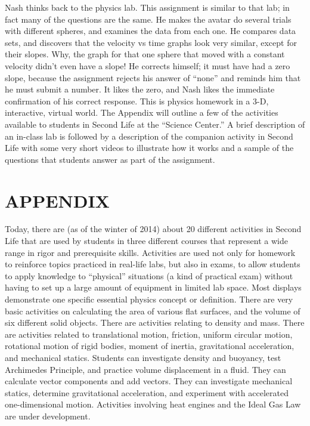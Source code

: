 \documentclass[11.5pt]{sig-alternate} %
\begin{document}
\begin{large}
Nash thinks back to the physics lab. This assignment is similar to that lab; in fact many of the questions are the same. He makes the avatar do several trials with different spheres, and examines the data from each one. He compares data sets, and discovers that the velocity vs time graphs look very similar, except for their slopes. Why, the graph for that one sphere that moved with a constant velocity didn’t even have a slope! He corrects himself; it must have had a zero slope, because the assignment rejects his answer of “none” and reminds him that he must submit a number. It likes the zero, and Nash likes the immediate confirmation of his correct response. This is physics homework in a 3-D, interactive, virtual world. The Appendix will outline a few of the activities available to students in Second Life at the “Science Center.” A brief description of an in-class lab is followed by a description of the companion activity in Second Life with some very short videos to illustrate how it works and a sample of the questions that students answer as part of the assignment.

\section*{APPENDIX}

Today, there are (as of the winter of 2014) about 20 different activities in Second Life that are used by students in three different courses that represent a wide range in rigor and prerequisite skills. Activities are used not only for homework to reinforce topics practiced in real-life labs, but also in exams, to allow students to apply knowledge to “physical” situations (a kind of practical exam) without having to set up a large amount of equipment in limited lab space. Most displays demonstrate one specific essential physics concept or definition. There are very basic activities on calculating the area of various flat surfaces, and the volume of six different solid objects. There are activities relating to density and mass. There are activities related to translational motion, friction, uniform circular motion, rotational motion of rigid bodies, moment of inertia, gravitational acceleration, and mechanical statics. Students can investigate density and buoyancy, test Archimedes Principle, and practice volume displacement in a fluid. They can calculate vector components and add vectors. They can investigate mechanical statics, determine gravitational acceleration, and experiment with accelerated one-dimensional motion. Activities involving heat engines and the Ideal Gas Law are under development.


\end{large}
\end{document}
